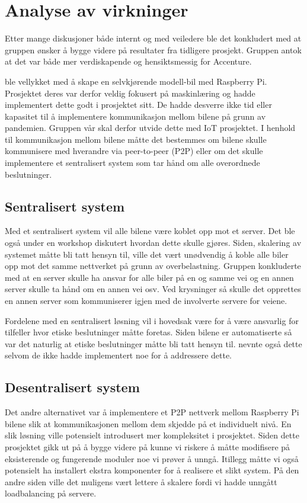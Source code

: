\chapter{Analyse av virkninger}
Etter mange diskusjoner både internt og med veiledere ble det konkludert med at gruppen ønsker å bygge videre på resultater fra tidligere prosjekt. Gruppen antok at det var både mer verdiskapende og hensiktsmessig for Accenture.

\cite{bachelor2020} ble vellykket med å skape en selvkjørende modell-bil med Raspberry Pi. Prosjektet deres var derfor veldig fokusert på maskinlæring og hadde implementert dette godt i prosjektet sitt. De hadde desverre ikke tid eller kapasitet til å implementere kommunikasjon mellom bilene på grunn av pandemien. Gruppen vår skal derfor utvide dette med IoT prosjektet. I henhold til kommunikasjon mellom bilene måtte det bestemmes om bilene skulle kommunisere med hverandre via peer-to-peer (P2P) eller om det skulle implementere et sentralisert system som tar hånd om alle overordnede beslutninger.

\section{Sentralisert system}
Med et sentralisert system vil alle bilene være koblet opp mot et server. Det ble også under en workshop diskutert hvordan dette skulle gjøres. Siden, skalering av systemet måtte bli tatt hensyn til, ville det vært unødvendig å koble alle biler opp mot det samme nettverket på grunn av overbelastning. Gruppen konkluderte med at en server skulle ha ansvar for alle biler på en og samme vei og en annen server skulle ta hånd om en annen vei osv. Ved krysninger så skulle det opprettes en annen server som kommuniserer igjen med de involverte servere for veiene.

Fordelene med en sentralisert løsning vil i hovedsak være for å være ansvarlig for tilfeller hvor etiske beslutninger måtte foretas. Siden bilene er automatiserte så var det naturlig at etiske beslutninger måtte bli tatt hensyn til. \cite{bachelor2020} nevnte også dette selvom de ikke hadde implementert noe for å addressere dette.

\section{Desentralisert system}
Det andre alternativet var å implementere et P2P nettverk mellom Raspberry Pi bilene slik at kommunikasjonen mellom dem skjedde på et individuelt nivå. En slik løsning ville potensielt introdusert mer kompleksitet i prosjektet. Siden dette prosjektet gikk ut på å bygge videre på \cite{bachelor2020} kunne vi riskere å måtte modifisere på eksisterende og fungerende moduler noe vi prøver å unngå. Itillegg måtte vi også potensielt ha installert ekstra komponenter for å realisere et slikt system. På den andre siden ville det muligens vært lettere å skalere fordi vi hadde unngått loadbalancing på servere.

